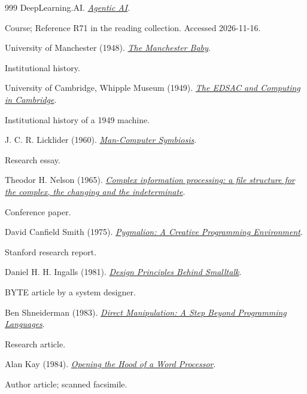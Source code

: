 \documentclass[11pt,letterpaper]{article}
\begin{document}
\begin{thebibliography}{999}
DeepLearning.AI.
\href{https://www.deeplearning.ai/courses/agentic-ai}{\emph{Agentic AI}}.
\par {\small Course; Reference R71 in the reading collection.}
{\small Accessed 2026-11-16.}

University of Manchester (1948).
\href{https://www.curation.cs.manchester.ac.uk/computer50/www.computer50.org/mark1/new.baby.html}{\emph{The Manchester Baby}}.
\par {\small Institutional history.}

University of Cambridge, Whipple Museum (1949).
\href{https://www.whipplemuseum.cam.ac.uk/explore-whipple-collections/calculating-devices/edsac-and-computing-cambridge}{\emph{The EDSAC and Computing in Cambridge}}.
\par {\small Institutional history of a 1949 machine.}

J. C. R. Licklider (1960).
\href{https://doi.org/10.1109/THFE2.1960.4503259}{\emph{Man-Computer Symbiosis}}.
\par {\small Research essay.}

Theodor H. Nelson (1965).
\href{https://doi.org/10.1145/800197.806036}{\emph{Complex information processing: a file structure for the complex, the changing and the indeterminate}}.
\par {\small Conference paper.}

David Canfield Smith (1975).
\href{https://worrydream.com/refs/Smith_DC_1975_-_Pygmalion.pdf}{\emph{Pygmalion: A Creative Programming Environment}}.
\par {\small Stanford research report.}

Daniel H. H. Ingalls (1981).
\href{https://rmod-files.lille.inria.fr/FreeBooks/BlueBookHughes/Design\%20Principles\%20Behind\%20Smalltalk.html}{\emph{Design Principles Behind Smalltalk}}.
\par {\small BYTE article by a system designer.}

Ben Shneiderman (1983).
\href{https://www.cs.umd.edu/~ben/papers/Shneiderman1983Direct.pdf}{\emph{Direct Manipulation: A Step Beyond Programming Languages}}.
\par {\small Research article.}

Alan Kay (1984).
\href{https://worrydream.com/refs/Kay_1984_-_Opening_the_Hood_of_a_Word_Processor.pdf}{\emph{Opening the Hood of a Word Processor}}.
\par {\small Author article; scanned facsimile.}


\end{thebibliography}
\end{document}
